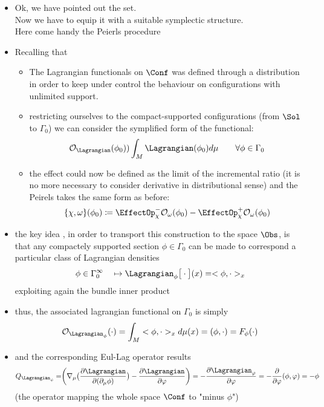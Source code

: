 \documentclass[a4paper,11pt]{scrartcl}
\begin{document}
    \begin{itemize}
        \item Ok, we have pointed out the set.\\
        Now we have to equip it with a suitable symplectic structure.\\
        Here come handy the Peierls procedure
        \item Recalling that
        \begin{itemize}
            \item The Lagrangian functionals on $\Conf$ was defined through a distribution in order to keep under control the behaviour on configurations with unlimited support.
            \item restricting ourselves to the compact-supported configurations (from $\Sol$ to $\Gamma_0$) we can consider the symplified form of the functional:
            $$ \mathcal{O}_\Lagrangian ( \phi_0) ) \int_M \Lagrangian(\phi_0) d \mu \qquad \forall \phi \in \Gamma_0$$
            \item the effect could now be defined as the limit of the incremental ratio (it is no more necessary to consider derivative in distributional sense) and the Peirels takes the same form as before:
            $$\{\chi, \omega \}(\phi_0) \coloneqq \EffectOp_\chi^- \mathcal{O}_\omega (\phi_0) - \EffectOp_\chi^+ \mathcal{O}_\omega(\phi_0) $$
        \end{itemize}
        \item the key idea , in order to transport this construction to the space $\Obs$, is that any compactely supported section $\phi \in \Gamma_0$ can be made to correspond a particular class of Lagrangian densities
        $$ \phi \in \Gamma_0^\infty \quad \mapsto \Lagrangian_\phi \big[\cdot \big] ( x ) = <\phi, \cdot>_x $$
        exploiting again the bundle inner product
        \item thus, the associated lagrangian functional on $\Gamma_0$ is simply
        $$                             \mathcal{O}_{\Lagrangian_\phi} (\cdot ) = \int_M  <\phi, \cdot>_x d\mu(x) = (\phi, \cdot) = F_\phi (\cdot)$$
        \item and the corresponding Eul-Lag operator results
        $$Q_{\Lagrangian_\phi}= \biggr( \nabla_\mu \big( \frac{\partial \Lagrangian}{\partial ( \partial_\mu \phi)} \big) - \frac{\partial \Lagrangian}{\partial \varphi} \biggr) = - \frac{\partial \Lagrangian_\varphi}{\partial \varphi} = -\frac{\partial}{\partial \varphi} (\phi, \varphi) = -\phi$$
        (the operator mapping the whole space $\Conf$ to  "minus $\phi$")

\end{itemize}
\end{document}

